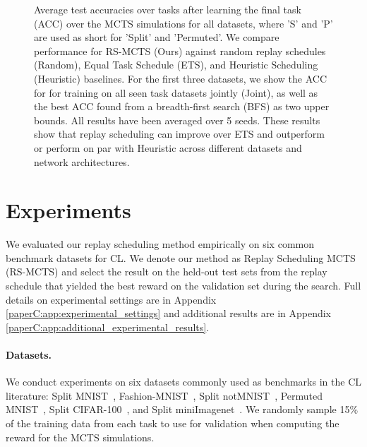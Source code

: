 
%

\begin{figure}[t]
	\centering
	\setlength{\figwidth}{0.23\textwidth}
	\setlength{\figheight}{.13\textheight}
	
	\vspace{-3mm}
	\caption{ Average test accuracies over tasks after learning the final task (ACC) over the MCTS simulations for all datasets, where 'S' and 'P' are used as short for 'Split' and 'Permuted'. We compare performance for RS-MCTS (Ours) against random replay schedules (Random), Equal Task Schedule (ETS), and Heuristic Scheduling (Heuristic) baselines. For the first three datasets, we show the ACC for for training on all seen task datasets jointly (Joint), as well as the best ACC found from a breadth-first search (BFS) as two upper bounds. All results have been averaged over 5 seeds. These results show that replay scheduling can improve over ETS and outperform or perform on par with Heuristic across different datasets and network architectures.
	}
	\label{fig:mcts_best_rewards}
	\vspace{-3mm}
\end{figure}


\section{Experiments}\label{paperC:sec:experiments}

We evaluated our replay scheduling method empirically on six common benchmark datasets for CL. 
We denote our method as Replay Scheduling MCTS (RS-MCTS) and select the result on the held-out test sets from the replay schedule that yielded the best reward on the validation set during the search.
Full details on experimental settings are in Appendix \ref{paperC:app:experimental_settings} and additional results are in Appendix \ref{paperC:app:additional_experimental_results}. 

\vspace{-3mm}
\paragraph{Datasets.} We conduct experiments on six datasets commonly used as benchmarks in the CL literature: Split MNIST~, Fashion-MNIST~, Split notMNIST~, Permuted MNIST~, Split CIFAR-100~, and Split miniImagenet~. We randomly sample 15\% of the training data from each task to use for validation when computing the reward for the MCTS simulations. 

